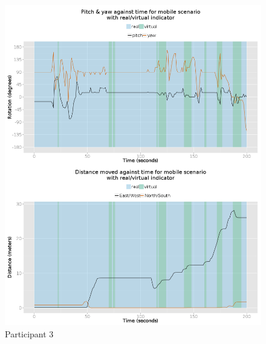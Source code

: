 \documentclass[oneside]{book}
\begin{document}
\begin{figure}[h]
	\begin{center}
		\includegraphics[width=\linewidth]{images/25072014_1400_2up.png}
		\caption{Participant 3}
		\label{participant_3_2up}
	\end{center}
\end{figure}

\end{document}
